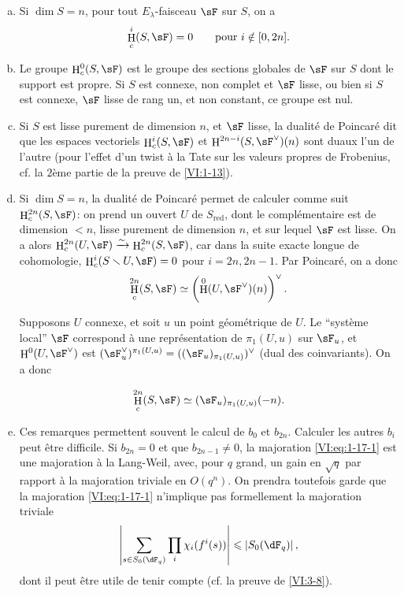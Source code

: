 \documentclass[oneside]{book}
\DeclareMathOperator{\h}{H}
\newcommand{\iso}{\xrightarrow\sim}
\renewcommand{\setminus}{\smallsetminus}
\theoremstyle{sga-source}
\theoremstyle{sga-source-dash}
\theoremstyle{sga-source-dotdash}
\theoremstyle{sga-source-number-note-dash}
\theoremstyle{sga-source-note-number-dotdash}
\theoremstyle{sga-source-example-dotdash}
\theoremstyle{sga-source-inline-number}
\theoremstyle{sga-source-bare-number}
\theoremstyle{sga-source}
\newcommand{\PrintPage}[1]{}\newcommand{\MathPage}[1]{}\newcommand{\PrintCite}[2]{#1}\newcommand{\var}[3]{#2}
\begin{document}
\begin{enumerate}[a)]
  \item Si $\dim S=n$, pour tout $E_\lambda$-faisceau $\sF$ sur $S$, on a 
    \[
      \h_c^i(S,\sF) = 0 \qquad \text{pour $i\notin [0,2n]$.}
    \]
  \item Le groupe $\h_c^0(S,\sF)$ est le groupe des sections globales de $\sF$ 
    sur $S$ dont le support est propre. Si $S$ est connexe, non complet et 
    $\sF$ lisse, ou bien si $S$ est connexe, $\sF$ lisse de rang un, et non 
    constant, ce groupe est nul.
  \item Si $S$ est lisse purement de dimension $n$, et $\sF$ lisse, la 
    dualité de Poincaré dit que les espaces vectoriels 
    \var{$\h_c^i(X,\sF)$ et $\h^{2n-i}(X,\sF^\vee)(2n)$}{$\h_c^i(S,\sF)$ et $\h^{2n-i}(S,\sF^\vee)(n)$}{S45-SOL-0707} sont duaux l'un de l'autre 
    (pour l'effet d'un twist à la Tate sur les valeurs propres de Frobenius, 
    cf. la $2$ème partie de la preuve de \ref{VI:1-13}).
  \item Si $\dim S=n$, la dualité de Poincaré permet de calculer comme 
    suit $\h_c^{2n}(S,\sF)$: on prend un ouvert $U$ de $S_\text{red}$, dont le 
    complémentaire est de dimension $<n$, lisse purement de dimension $n$, et 
    sur lequel $\sF$ est lisse. On a alors 
    $\h_c^{2n}(U,\sF) \iso \h_c^{2n}(S,\sF)$, car dans la suite exacte longue 
    de cohomologie, $\h_c^i(S\setminus U,\sF) = 0$ pour $i=2n,2n-1$. Par 
    Poincaré, on a donc 
    \[
      \h_c^{2n}(S,\sF) \simeq \left(\var{\h^0(U,\sF^\vee)(2n)}{\h^0(U,\sF^\vee)(n)}{S45-SOL-0710}\right)^\vee \text{.}
    \]
    
    Supposons $U$ connexe, et soit $u$ un point géométrique de $U$. Le 
    ``système local'' $\sF$ correspond à une représentation de 
    $\pi_1(U,u)$ sur $\sF_u$, et $\h^0(U,\sF^\vee)$ est 
    $(\sF_u^\vee)^{\pi_1(U,u)}=((\sF_u)_{\pi_1(U,u)})^\vee$ (dual des 
    coinvariants). On a donc 
    \PrintPage{179}
\[
      \h_c^{2n}(S,\sF) \simeq \var{(\sF_u)_{\pi_1(U,u)}(-2n)}{(\sF_u)_{\pi_1(U,u)}(-n)}{S45-SOL-0711} \text{.}
    \]
  \item Ces remarques permettent souvent le calcul de $b_0$ et $b_{2n}$. 
    Calculer les autres $b_i$ peut être difficile. Si $b_{2n}=0$ et que 
    $b_{2n-1}\ne 0$, la majoration \eqref{VI:eq:1-17-1} est une majoration à la 
    Lang-Weil, avec, pour $q$ grand, un gain en $\sqrt q$ par rapport à la 
    majoration triviale en $O(q^n)$. On prendra toutefois garde que la 
    majoration \eqref{VI:eq:1-17-1} n'implique pas formellement la majoration 
    triviale 
    \[
      \left|\sum_{s\in S_0(\dF_q)} \prod_i \chi_i(f^i(s))\right| \leqslant \left| S_0(\dF_q)\right| \text{,}
    \]
    dont il peut être utile de tenir compte (cf. la preuve de \ref{VI:3-8}). 
\end{enumerate}
\end{document}
